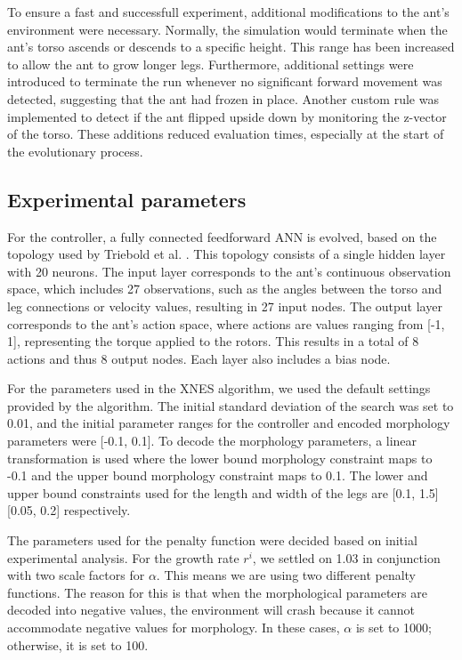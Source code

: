         To ensure a fast and successfull experiment, additional modifications to the ant's environment were necessary. Normally, the simulation would terminate when the ant's torso ascends or descends to a specific height. This range has been increased to allow the ant to grow longer legs. Furthermore, additional settings were introduced to terminate the run whenever no significant forward movement was detected, suggesting that the ant had frozen in place. Another custom rule was implemented to detect if the ant flipped upside down by monitoring the z-vector of the torso. These additions reduced evaluation times, especially at the start of the evolutionary process.

    \subsection{Experimental parameters}
        For the controller, a fully connected feedforward ANN is evolved, based on the topology used by Triebold et al. \cite{Corinna_Triebold}. This topology consists of a single hidden layer with 20 neurons. The input layer corresponds to the ant's continuous observation space, which includes 27 observations, such as the angles between the torso and leg connections or velocity values, resulting in 27 input nodes. The output layer corresponds to the ant's action space, where actions are values ranging from [-1, 1], representing the torque applied to the rotors. This results in a total of 8 actions and thus 8 output nodes. Each layer also includes a bias node.
        
        For the parameters used in the XNES algorithm, we used the default settings provided by the algorithm. The initial standard deviation of the search was set to 0.01, and the initial parameter ranges for the controller and encoded morphology parameters were [-0.1, 0.1]. To decode the morphology parameters, a linear transformation is used where the lower bound morphology constraint maps to -0.1 and the upper bound morphology constraint maps to 0.1. The lower and upper bound constraints used for the length and width of the legs are [0.1, 1.5] [0.05, 0.2] respectively.
        
        The parameters used for the penalty function were decided based on initial experimental analysis. For the growth rate $r^i$, we settled on 1.03 in conjunction with two scale factors for $\alpha$. This means we are using two different penalty functions. The reason for this is that when the morphological parameters are decoded into negative values, the environment will crash because it cannot accommodate negative values for morphology. In these cases, $\alpha$ is set to 1000; otherwise, it is set to 100.
        
